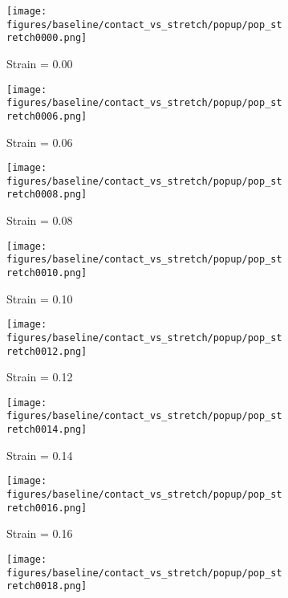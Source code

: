 \vspace*{0cm}
\begin{figure}[H]
    \centering
    \begin{subfigure}[b]{0.49\textwidth}
        \centering
        \texttt{[image: figures/baseline/contact\_vs\_stretch/popup/pop\_stretch0000.png]}
        \caption{Strain = 0.00}
    \end{subfigure}
    \hfill
    \begin{subfigure}[b]{0.49\textwidth}
        \centering
        \texttt{[image: figures/baseline/contact\_vs\_stretch/popup/pop\_stretch0006.png]}
        \caption{Strain = 0.06}
    \end{subfigure}
    \begin{subfigure}[b]{0.49\textwidth}
        \centering
        \texttt{[image: figures/baseline/contact\_vs\_stretch/popup/pop\_stretch0008.png]}
        \caption{Strain = 0.08}
    \end{subfigure}
    \hfill
    \begin{subfigure}[b]{0.49\textwidth}
        \centering
        \texttt{[image: figures/baseline/contact\_vs\_stretch/popup/pop\_stretch0010.png]}
        \caption{Strain = 0.10}
    \end{subfigure}
    \hfill
    \begin{subfigure}[b]{0.49\textwidth}
        \centering
        \texttt{[image: figures/baseline/contact\_vs\_stretch/popup/pop\_stretch0012.png]}
        \caption{Strain = 0.12}
    \end{subfigure}
    \hfill
    \begin{subfigure}[b]{0.49\textwidth}
        \centering
        \texttt{[image: figures/baseline/contact\_vs\_stretch/popup/pop\_stretch0014.png]}
        \caption{Strain = 0.14}
    \end{subfigure}
    \begin{subfigure}[b]{0.49\textwidth}
        \centering
        \texttt{[image: figures/baseline/contact\_vs\_stretch/popup/pop\_stretch0016.png]}
        \caption{Strain = 0.16}
    \end{subfigure}
    \hfill
    \begin{subfigure}[b]{0.49\textwidth}
        \centering
        \texttt{[image: figures/baseline/contact\_vs\_stretch/popup/pop\_stretch0018.png]}

\end{subfigure}
\end{figure}
